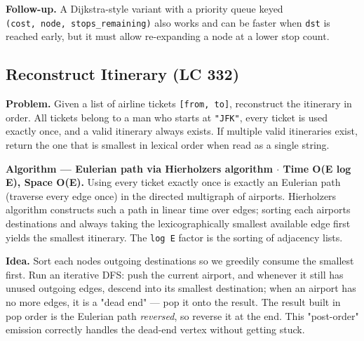 \documentclass[11pt]{article}
\begin{document}
\textbf{Follow-up.} A Dijkstra-style variant with a priority queue keyed \texttt{(cost,\ node,\ stops\_remaining)} also works and can be faster when \texttt{dst} is reached early, but it must allow re-expanding a node at a lower stop count.

\subsection{Reconstruct Itinerary (LC 332)}\label{reconstruct-itinerary-lc-332}

\textbf{Problem.} Given a list of airline tickets \texttt{{[}from,\ to{]}}, reconstruct the itinerary in order. All tickets belong to a man who starts at \texttt{"JFK"}, every ticket is used exactly once, and a valid itinerary always exists. If multiple valid itineraries exist, return the one that is smallest in lexical order when read as a single string.

\textbf{Algorithm --- Eulerian path via Hierholzer\textquotesingle s algorithm \(\cdot\) Time O(E log E), Space O(E).} Using every ticket exactly once is exactly an Eulerian path (traverse every edge once) in the directed multigraph of airports. Hierholzer\textquotesingle s algorithm constructs such a path in linear time over edges; sorting each airport\textquotesingle s destinations and always taking the lexicographically smallest available edge first yields the smallest itinerary. The \texttt{log\ E} factor is the sorting of adjacency lists.

\textbf{Idea.} Sort each node\textquotesingle s outgoing destinations so we greedily consume the smallest first. Run an iterative DFS: push the current airport, and whenever it still has unused outgoing edges, descend into its smallest destination; when an airport has no more edges, it is a "dead end" --- pop it onto the result. The result built in pop order is the Eulerian path \emph{reversed}, so reverse it at the end. This "post-order" emission correctly handles the dead-end vertex without getting stuck.

\end{document}
